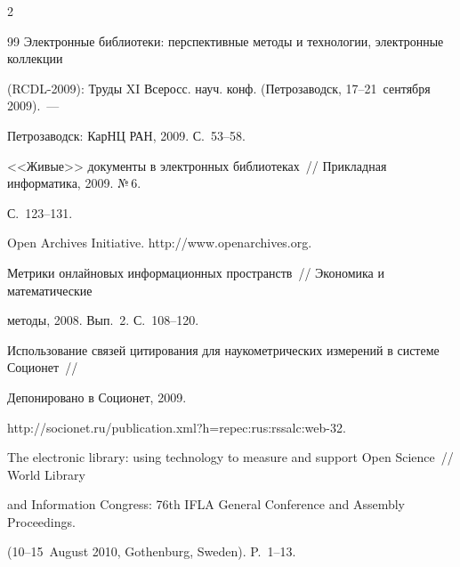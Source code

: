 \begin{multicols}{2}
{{\begin{thebibliography}{99}
Электронные библиотеки: перспективные методы и технологии, электронные коллек\-ции 


(RCDL-2009): Труды XI Всеросс. науч. конф. (Петрозаводск, 17--21~сентября 2009).~--- 


Петрозаводск: КарНЦ РАН, 2009. С.~53--58.









<<Живые>> документы в электронных библиотеках~// Прикладная информатика, 2009. №\,6. 


С.~123--131.







Open Archives Initiative. {\sf http://www.openarchives.org}.









Метрики онлайновых информационных пространств~// Экономика и математические 


методы, 2008. Вып.~2. С.~108--120.









Использование связей цитирования для наукометрических измерений в системе Соционет~// 


Депонировано в Соционет, 2009. 


{\sf http://socionet.ru/publication.xml?h=repec:\linebreak rus:rssalc:web-32}.









The electronic library: using technology to measure and support Open Science~// World Library 


and Information Congress: 76th IFLA General Conference and Assembly Proceedings. 


(10--15~August 2010, Gothenburg, Sweden). P.~1--13. 






\end{thebibliography}}}
\end{multicols}
